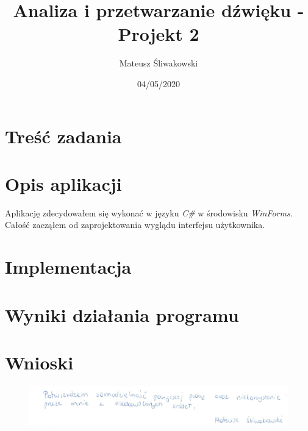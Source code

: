 \documentclass{article}
\title{Analiza i przetwarzanie dźwięku - Projekt 2}
\date{04/05/2020}
\author{Mateusz Śliwakowski}
\begin{document}
  \maketitle
  
\section{Treść zadania}

\section{Opis aplikacji}

Aplikację zdecydowałem się wykonać w języku \textit{C\#} w środowisku \textit{WinForms}. Całość zacząłem od zaprojektowania wyglądu interfejsu użytkownika.

\section{Implementacja}

\section{Wyniki działania programu}

\section{Wnioski}

\begin{figure}[b]
\centering
\includegraphics[width=5in]{bottom.png}
\end{figure}
\end{document}
